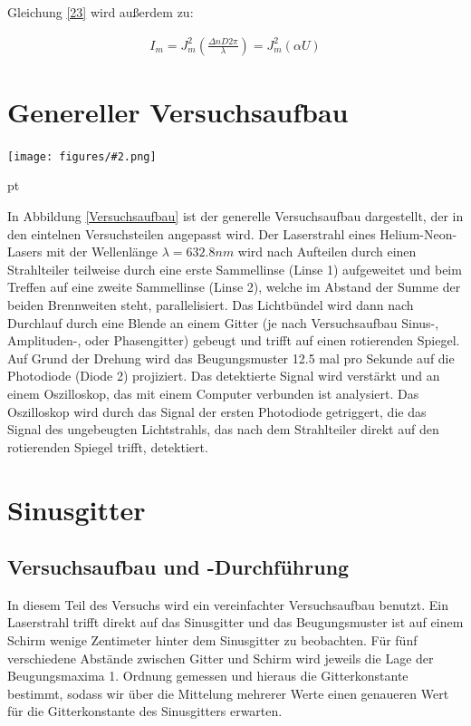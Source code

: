 \documentclass[12pt]{article}
\newcommand{\gra}[3][0.7]{
	\begin{minipage}[h!]{\textwidth}
		\centering
		\texttt{[image: figures/\#2.png]}
		\captionof{figure}{#3}
	\end{minipage}
	\vskip 30 pt
}
\begin{document}
Gleichung \ref{23} wird außerdem zu:

\begin{align}
I_m = J_m^2 \left( \frac{\Delta n D 2 \pi}{\lambda} \right) = J_m^2\left(\alpha U \right) 
\end{align}
\newpage
\section{Genereller Versuchsaufbau} \label{Aufbau}

\gra[1]{Versuchsaufbau}{Versuchsaufbau \label{Versuchsaufbau}}

In Abbildung \ref{Versuchsaufbau} ist der generelle Versuchsaufbau dargestellt, der in den eintelnen Versuchsteilen angepasst wird.
Der Laserstrahl eines Helium-Neon-Lasers mit der Wellenlänge $\lambda = 632.8 nm$ wird nach Aufteilen durch einen Strahlteiler  teilweise durch eine erste Sammellinse (Linse 1) aufgeweitet und beim Treffen auf eine zweite Sammellinse (Linse 2), welche im Abstand der Summe der beiden Brennweiten steht, parallelisiert. Das Lichtbündel wird dann nach Durchlauf durch eine Blende an einem Gitter (je nach Versuchsaufbau Sinus-, Amplituden-, oder Phasengitter) gebeugt und trifft auf einen rotierenden Spiegel. Auf Grund der Drehung wird das Beugungsmuster 12.5 mal pro Sekunde auf die Photodiode (Diode 2) projiziert. Das detektierte Signal wird verstärkt und an einem Oszilloskop, das mit einem Computer verbunden ist analysiert. Das Oszilloskop wird durch das Signal der ersten Photodiode getriggert, die das Signal des ungebeugten Lichtstrahls, das nach dem Strahlteiler direkt auf den rotierenden Spiegel trifft, detektiert.

\newpage

\section{Sinusgitter}


\subsection{Versuchsaufbau und -Durchführung}

In diesem Teil des Versuchs wird ein vereinfachter Versuchsaufbau benutzt. Ein Laserstrahl trifft direkt auf das Sinusgitter und das Beugungsmuster ist auf einem Schirm wenige Zentimeter hinter dem Sinusgitter zu beobachten. Für fünf verschiedene Abstände zwischen Gitter und Schirm wird jeweils die Lage der Beugungsmaxima 1. Ordnung gemessen und hieraus die Gitterkonstante bestimmt, sodass wir über die Mittelung mehrerer Werte einen genaueren Wert für die Gitterkonstante des Sinusgitters erwarten.
\end{document}
